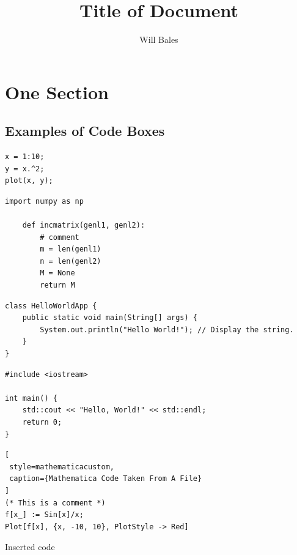 \documentclass[10pt]{article}
\title{Title of Document}
\author{Will Bales}
\date{}
\theoremstyle{plain}
\theoremstyle{definition}
\theoremstyle{remark}
\theoremstyle{exercise-style}
\numberwithin{equation}{section}
\numberwithin{theorem}{section}
\numberwithin{remark}{section}
\begin{document}
\maketitle

\section{One Section}

\subsection{Examples of Code Boxes}


\begin{lstlisting}[style=matlabcustom, caption={Example MATLAB code}]
x = 1:10;
y = x.^2;
plot(x, y);
\end{lstlisting}

\begin{lstlisting}[style=pythoncustom, caption={Python example}]
    import numpy as np
    
    def incmatrix(genl1, genl2):
        # comment
        m = len(genl1)
        n = len(genl2)
        M = None
        return M
\end{lstlisting}

\begin{lstlisting}[style=javacustom, caption={Java example}]
class HelloWorldApp {
    public static void main(String[] args) {
        System.out.println("Hello World!"); // Display the string.
    }
}
\end{lstlisting}

\begin{lstlisting}[style=cppcustom, caption={C++ example}]
#include <iostream>

int main() {
    std::cout << "Hello, World!" << std::endl;
    return 0;
}
\end{lstlisting}

\begin{lstlisting}[
 style=mathematicacustom,
 caption={Mathematica Code Taken From A File}
]
(* This is a comment *)
f[x_] := Sin[x]/x;
Plot[f[x], {x, -10, 10}, PlotStyle -> Red]
\end{lstlisting}

Inserted code

\end{document}
